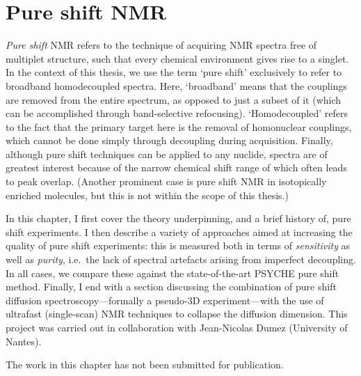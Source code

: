 \chapter{Pure shift NMR}
\label{chpt:pureshift}

\textit{Pure shift} NMR refers to the technique of acquiring NMR spectra free of multiplet structure, such that every chemical environment gives rise to a singlet.\autocite{Zangger2015PNMRS,Castanar2017MRC}
In the context of this thesis, we use the term `pure shift' exclusively to refer to broadband homodecoupled \proton{} spectra.
Here, `broadband' means that the couplings are removed from the entire spectrum, as opposed to just a subset of it (which can be accomplished through band-selective refocusing).
`Homodecoupled' refers to the fact that the primary target here is the removal of homonuclear couplings, which cannot be done simply through decoupling during acquisition.
Finally, although pure shift techniques can be applied to any nuclide, \proton{} spectra are of greatest interest because of the narrow chemical shift range of \proton{} which often leads to peak overlap.
(Another prominent case is \carbon{} pure shift NMR in isotopically enriched molecules, but this is not within the scope of this thesis.)

In this chapter, I first cover the theory underpinning, and a brief history of, pure shift experiments.
I then describe a variety of approaches aimed at increasing the quality of pure shift experiments: this is measured both in terms of \textit{sensitivity} as well as \textit{purity}, i.e.\ the lack of spectral artefacts arising from imperfect decoupling.
In all cases, we compare these against the state-of-the-art PSYCHE pure shift method.
Finally, I end with a section discussing the combination of pure shift diffusion spectroscopy---formally a pseudo-3D experiment---with the use of ultrafast (single-scan) NMR techniques to collapse the diffusion dimension.
This project was carried out in collaboration with Jean-Nicolas Dumez (University of Nantes).

The work in this chapter has not been submitted for publication.









\printbibliography[heading=subbibnumbered]{}
